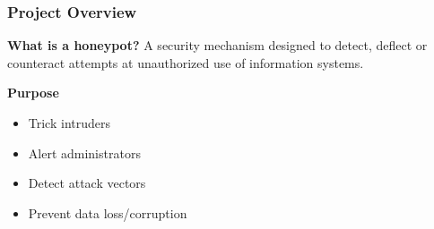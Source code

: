 \begin{frame}
\frametitle{Project Overview}

\begin{block}{\textbf{What is a honeypot?}}
A security mechanism designed to detect, deflect or counteract attempts at unauthorized use of information systems.
\end{block}
 
\textbf{Purpose}
\begin{itemize}
\item Trick intruders
\item Alert administrators
\item Detect attack vectors
\item Prevent data loss/corruption
\end{itemize}
\end{frame}
